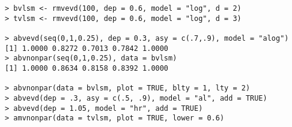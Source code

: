 \documentclass[11pt,a4paper]{article}
\begin{document}






\begin{verbatim}
> bvlsm <- rmvevd(100, dep = 0.6, model = "log", d = 2)
> tvlsm <- rmvevd(100, dep = 0.6, model = "log", d = 3)

> abvevd(seq(0,1,0.25), dep = 0.3, asy = c(.7,.9), model = "alog")
[1] 1.0000 0.8272 0.7013 0.7842 1.0000
> abvnonpar(seq(0,1,0.25), data = bvlsm)
[1] 1.0000 0.8634 0.8158 0.8392 1.0000

> abvnonpar(data = bvlsm, plot = TRUE, blty = 1, lty = 2)
> abvevd(dep = .3, asy = c(.5, .9), model = "al", add = TRUE)
> abvevd(dep = 1.05, model = "hr", add = TRUE)
> amvnonpar(data = tvlsm, plot = TRUE, lower = 0.6)
\end{verbatim}
\end{document}
